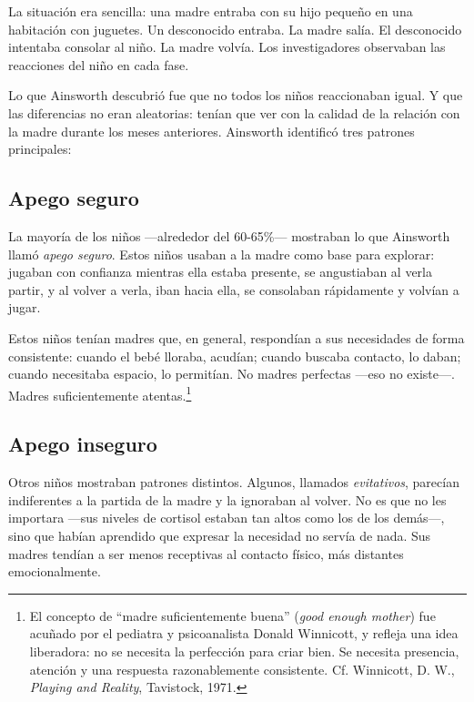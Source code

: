 La situación era sencilla: una madre entraba con su hijo pequeño en una habitación con juguetes. Un desconocido entraba. La madre salía. El desconocido intentaba consolar al niño. La madre volvía. Los investigadores observaban las reacciones del niño en cada fase.

Lo que Ainsworth descubrió fue que no todos los niños reaccionaban igual. Y que las diferencias no eran aleatorias: tenían que ver con la calidad de la relación con la madre durante los meses anteriores. Ainsworth identificó tres patrones principales:

\subsection{Apego seguro}

La mayoría de los niños ---alrededor del 60-65\%--- mostraban lo que Ainsworth llamó \textit{apego seguro}. Estos niños usaban a la madre como base para explorar: jugaban con confianza mientras ella estaba presente, se angustiaban al verla partir, y al volver a verla, iban hacia ella, se consolaban rápidamente y volvían a jugar.

Estos niños tenían madres que, en general, respondían a sus necesidades de forma consistente: cuando el bebé lloraba, acudían; cuando buscaba contacto, lo daban; cuando necesitaba espacio, lo permitían. No madres perfectas ---eso no existe---. Madres suficientemente atentas.\footnote{El concepto de ``madre suficientemente buena'' (\textit{good enough mother}) fue acuñado por el pediatra y psicoanalista Donald Winnicott, y refleja una idea liberadora: no se necesita la perfección para criar bien. Se necesita presencia, atención y una respuesta razonablemente consistente. Cf. Winnicott, D. W., \textit{Playing and Reality}, Tavistock, 1971.}

\subsection{Apego inseguro}

Otros niños mostraban patrones distintos. Algunos, llamados \textit{evitativos}, parecían indiferentes a la partida de la madre y la ignoraban al volver. No es que no les importara ---sus niveles de cortisol estaban tan altos como los de los demás---, sino que habían aprendido que expresar la necesidad no servía de nada. Sus madres tendían a ser menos receptivas al contacto físico, más distantes emocionalmente.

